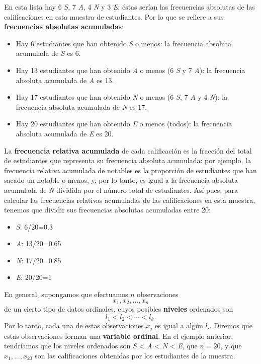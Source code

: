 \documentclass[]{book}
\providecommand{\tightlist}{%
  \setlength{\itemsep}{0pt}\setlength{\parskip}{0pt}}
\theoremstyle{definition}
\theoremstyle{definition}
\theoremstyle{definition}
\theoremstyle{remark}
\begin{document}
En esta lista hay 6 \emph{S}, 7 \emph{A}, 4 \emph{N} y 3 \emph{E}: éstas serían las frecuencias absolutas de las calificaciones en esta muestra de estudiantes. Por lo que se refiere a sus \textbf{frecuencias absolutas acumuladas}:

\begin{itemize}
\tightlist
\item
  Hay 6 estudiantes que han obtenido \emph{S} o menos: la frecuencia absoluta acumulada de \emph{S} es 6.
\item
  Hay 13 estudiantes que han obtenido \emph{A} o menos (6 \emph{S} y 7 \emph{A}): la frecuencia absoluta acumulada de \emph{A} es 13.
\item
  Hay 17 estudiantes que han obtenido \emph{N} o menos (6 \emph{S}, 7 \emph{A} y 4 \emph{N}): la frecuencia absoluta acumulada de \emph{N} es 17.
\item
  Hay 20 estudiantes que han obtenido \emph{E} o menos (todos): la frecuencia absoluta acumulada de \emph{E} es 20.
\end{itemize}

La \textbf{frecuencia relativa acumulada} de cada calificación es la fracción del total de estudiantes que representa su frecuencia absoluta acumulada: por ejemplo, la frecuencia relativa acumulada de notables es la proporción de estudiantes que han sacado un notable o menos, y, por lo tanto, es igual a la frecuencia absoluta acumulada de \emph{N} dividida por el número total de estudiantes. Así pues, para calcular las frecuencias relativas acumuladas de las calificaciones en esta muestra, tenemos que dividir sus frecuencias absolutas acumuladas entre 20:

\begin{itemize}
\tightlist
\item
  \emph{S}: 6/20=0.3
\item
  \emph{A}: 13/20=0.65
\item
  \emph{N}: 17/20=0.85
\item
  \emph{E}: 20/20=1
\end{itemize}

En general, supongamos que efectuamos \(n\) observaciones
\[
x_1,x_2,\ldots,x_n
\]
de un cierto tipo de datos ordinales, cuyos posibles \textbf{niveles} ordenados son
\[
l_1<l_2<\cdots <l_k.
\]
Por lo tanto, cada una de estas observaciones \(x_j\) es igual a algún \(l_i\). Diremos que estas observaciones forman una \textbf{variable ordinal}. En el ejemplo anterior, tendríamos que los niveles ordenados son \emph{S} \textless{} \emph{A} \textless{} \emph{N} \textless{} \emph{E}, que \(n=20\), y que \(x_1,\ldots,x_{20}\) son las calificaciones obtenidas por los estudiantes de la muestra.
\end{document}
